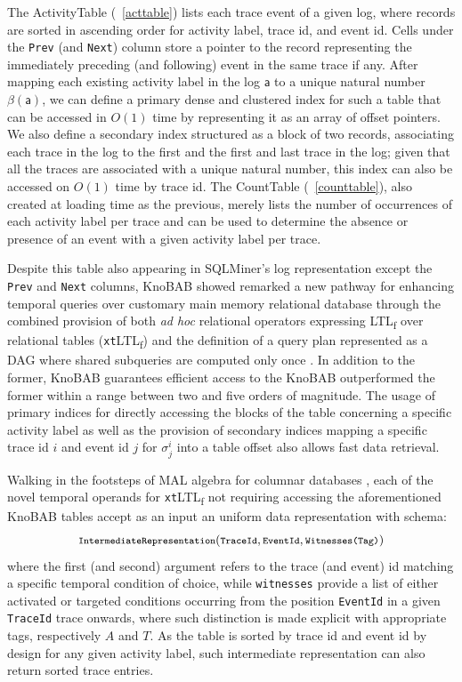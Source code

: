 \documentclass[sigconf]{acmart}
\newcommand{\const}[1]{\ensuremath{\mathsf{#1}}}
\begin{document}
The ActivityTable (\tablename~\ref{acttable}) lists each trace event of a given log, where records are sorted in ascending order for activity label, trace id, and event id. Cells under the  \texttt{Prev} (and \texttt{Next}) column store a pointer to the record representing the immediately preceding (and following) event in the same trace if any. After mapping each existing activity label in the log $\const{a}$ to a unique natural number $\beta(\const{a})$, we can define a primary dense and clustered index for such a table that can be accessed in $O(1)$ time by representing it as an array of offset pointers. We also define a secondary index structured as a block of two records, associating each trace in the log to the first and the first and last trace in the log; given that all the traces are associated with a unique natural number, this index can also be accessed on $O(1)$ time by trace id. The CountTable (\tablename~\ref{counttable}), also created at loading time as the previous, merely lists the number of occurrences of each activity label per trace and can be used to determine the absence or presence of an event with a given activity label per trace.

Despite this table also appearing in SQLMiner's log representation \cite{SchonigRCJM16} except the \texttt{Prev} and \texttt{Next} columns, KnoBAB showed remarked a new pathway for enhancing temporal queries over customary main memory relational database through the combined provision of both \textit{ad hoc}  relational operators expressing LTL\textsubscript{f} over relational tables (\texttt{xt}LTL\textsubscript{f}) and the definition of a query plan represented as a DAG where shared subqueries are computed only once \cite{BellatrecheKB21}. In addition to the former, KnoBAB guarantees efficient access to the KnoBAB outperformed the former within a range between two and five  orders of magnitude. The usage of primary indices for directly accessing the blocks of the table concerning a specific activity label as well as the provision of secondary indices mapping a specific trace id $i$ and event id $j$ for $\sigma^i_j$ into a table offset also allows fast data retrieval.

Walking in the footsteps of MAL algebra for columnar databases \cite{IdreosGNMMK12}, each of the novel temporal operands for \texttt{xt}LTL\textsubscript{f} not requiring accessing the aforementioned KnoBAB tables accept as an input an uniform data representation with schema: \[\footnotesize \texttt{IntermediateRepresentation}(\texttt{TraceId},\texttt{EventId},\texttt{Witnesses(Tag)})\] where the first (and second) argument refers to the trace (and event) id matching a specific temporal condition of choice, while \texttt{witnesses} provide a list of either  activated or targeted conditions occurring from the position \texttt{EventId} in a given \texttt{TraceId} trace onwards, where such distinction is made explicit with appropriate tags, respectively $A$ and $T$. As the table is sorted by trace id and event id by design for any given activity label, such intermediate representation can also return sorted trace entries.
\bigskip
\end{document}
